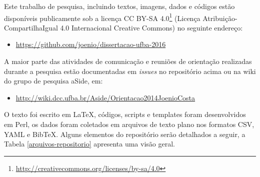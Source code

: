 {}
\label{reproducibilidade-do-estudo}

Este trabalho de pesquisa, incluindo textos, imagens, dados e códigos estão
disponíveis publicamente sob a
licença CC BY-SA 4.0\footnote{\url{http://creativecommons.org/licenses/by-sa/4.0}}
(Licença Atribuição-CompartilhaIgual 4.0 Internacional Creative Commons)
no seguinte endereço:

\begin{itemize}
  \item \url{https://github.com/joenio/dissertacao-ufba-2016}
\end{itemize}

A maior parte das atividades de comunicação e reuniões de orientação realizadas
durante a pesquisa estão documentadas em {\it issues} no repositório acima ou na wiki do
grupo de pesquisa aSide, em:

\begin{itemize}
  \item \url{http://wiki.dcc.ufba.br/Aside/Orientacao2014JoenioCosta}
\end{itemize}

O texto foi escrito em \LaTeX, códigos, scripts e templates foram desenvolvidos
em Perl, os dados foram coletados em arquivos de texto plano nos formatos CSV,
YAML e BibTeX. Alguns elementos do repositório serão detalhados a seguir, a Tabela
\ref{arquivos-repositorio} apresenta uma visão geral.


